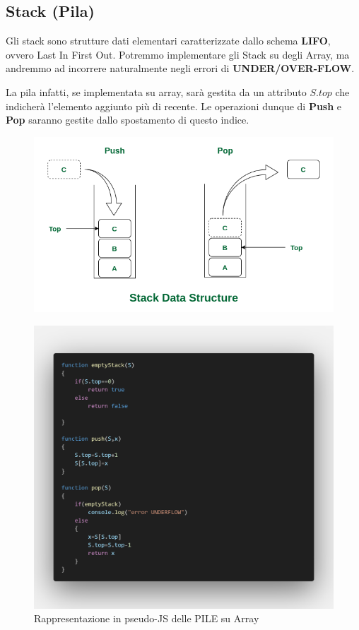 \documentclass{article}
\begin{document}
\newpage

\subsection{Stack (Pila)}

Gli stack sono strutture dati elementari caratterizzate dallo schema \textbf{LIFO}, ovvero Last In First Out. Potremmo implementare gli Stack su degli Array, ma andremmo ad incorrere naturalmente negli errori di \textbf{UNDER/OVER-FLOW}.

La pila infatti, se implementata su array, sarà gestita da un attributo \(S.top\) che indicherà l'elemento aggiunto più di recente. Le operazioni dunque di \textbf{Push} e \textbf{Pop} saranno gestite dallo spostamento di questo indice.

\begin{figure}[htbp]
    \center
    \includegraphics[scale=0.35]{img/stackImmagine.png}
\end{figure}

\begin{figure}[htbp]
    \center
    \includegraphics[scale=0.2]{img/stackOperazioni.png}
    \caption{Rappresentazione in pseudo-JS delle PILE su Array}
\end{figure}
\end{document}
